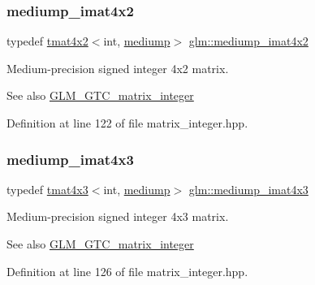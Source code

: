 \subsubsection{\texorpdfstring{mediump\_imat4x2}{mediump\_imat4x2}}
{\footnotesize\ttfamily typedef \mbox{\hyperlink{structglm_1_1tmat4x2}{tmat4x2}}$<$int, \mbox{\hyperlink{namespaceglm_a0f04f086094c747d227af4425893f545a6416f3ea0c9025fb21ed50c4d6620482}{mediump}}$>$ \mbox{\hyperlink{group__gtc__matrix__integer_gabfe107153637dfd7a0c272ff1ba892ed}{glm\+::mediump\+\_\+imat4x2}}}

Medium-\/precision signed integer 4x2 matrix. \begin{DoxySeeAlso}{See also}
\mbox{\hyperlink{group__gtc__matrix__integer}{G\+L\+M\+\_\+\+G\+T\+C\+\_\+matrix\+\_\+integer}} 
\end{DoxySeeAlso}


Definition at line 122 of file matrix\+\_\+integer.\+hpp.

\mbox{\label{group__gtc__matrix__integer_ga0da8b13e141337d016a6541ea2c0362c}} 
\subsubsection{\texorpdfstring{mediump\_imat4x3}{mediump\_imat4x3}}
{\footnotesize\ttfamily typedef \mbox{\hyperlink{structglm_1_1tmat4x3}{tmat4x3}}$<$int, \mbox{\hyperlink{namespaceglm_a0f04f086094c747d227af4425893f545a6416f3ea0c9025fb21ed50c4d6620482}{mediump}}$>$ \mbox{\hyperlink{group__gtc__matrix__integer_ga0da8b13e141337d016a6541ea2c0362c}{glm\+::mediump\+\_\+imat4x3}}}

Medium-\/precision signed integer 4x3 matrix. \begin{DoxySeeAlso}{See also}
\mbox{\hyperlink{group__gtc__matrix__integer}{G\+L\+M\+\_\+\+G\+T\+C\+\_\+matrix\+\_\+integer}} 
\end{DoxySeeAlso}


Definition at line 126 of file matrix\+\_\+integer.\+hpp.

\mbox{\label{group__gtc__matrix__integer_gae226af929e72730be59a58d89a4be028}} 
